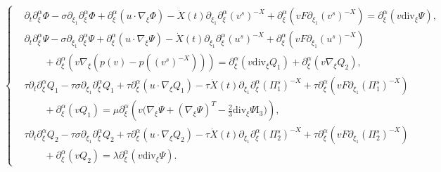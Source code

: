 \documentclass[10pt,a4paper]{amsart}
\newcommand{\ddiv}{\mathrm{div}}
\begin{document}
\begin{equation}\label{sys3}
\begin{cases}
&\partial_t\partial_\xi^\alpha\Phi-\sigma\partial_{\xi_1}\partial_\xi^\alpha\Phi
        + \partial_\xi^\alpha\left(u\cdot\nabla_\xi\Phi\right)
        -\dot{X}(t)\partial_{\xi_1}\partial_\xi^\alpha(v^s)^{-X}
 +\partial_\xi^\alpha\left(vF\partial_{\xi_1}(v^s)^{-X}\right)
 =\partial_\xi^\alpha\left(v\ddiv_\xi\Psi\right),\\
&\partial_t\partial_\xi^\alpha\Psi-\sigma\partial_{\xi_1}\partial_\xi^\alpha\Psi
        +\partial_\xi^\alpha\left( u\cdot\nabla_\xi\Psi\right)
        -\dot{X}(t)\partial_{\xi_1}\partial_\xi^\alpha(u^s)^{-X}
        +\partial_\xi^\alpha\left(vF\partial_{\xi_1}(u^s)^{-X}\right)\\
&\qquad +\partial_\xi^\alpha\left(v\nabla_\xi\left(p(v)-p((v^s)^{-X})\right)\right)
               =\partial_\xi^\alpha\left(v\ddiv_\xi Q_1\right)
               +\partial_\xi^\alpha\left(v\nabla_\xi Q_2\right),\\
&\tau\partial_t\partial_\xi^\alpha Q_1
-\tau\sigma\partial_{\xi_1}\partial_\xi^\alpha Q_1
+\tau\partial_\xi^\alpha\left( u\cdot\nabla_\xi Q_1\right)
-\tau\dot{X}(t)\partial_{\xi_1}\partial_\xi^\alpha(\Pi_1^s)^{-X}
+\tau\partial_\xi^\alpha\left(v F\partial_{\xi_1}(\Pi_1^s)^{-X}\right)
\\
 & \qquad+\partial_\xi^\alpha\left(vQ_1\right)
 =\mu\partial_\xi^\alpha\left(v\Big(\nabla_\xi\Psi+\left(\nabla_\xi\Psi\right)^T
   -\frac{2}{3}\ddiv_\xi\Psi \mathrm I_3\Big)\right),\\
&\tau\partial_t\partial_\xi^\alpha Q_2
-\tau\sigma\partial_{\xi_1}\partial_\xi^\alpha Q_2
+\tau\partial_\xi^\alpha\left( u\cdot\nabla_\xi Q_2\right)
-\tau\dot{X}(t)\partial_{\xi_1}\partial_\xi^\alpha(\Pi_2^s)^{-X}
+\tau \partial_\xi^\alpha\left(vF\partial_{\xi_1}(\Pi_2^s)^{-X}\right)
\\
&\qquad+\partial_\xi^\alpha\left(vQ_2\right)
=\lambda\partial_\xi^\alpha\left(v\ddiv_\xi \Psi\right).
\end{cases}
\end{equation}
\end{document}
